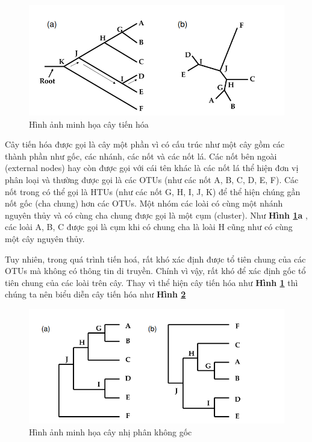 \documentclass[12pt]{report}
\begin{document}
\begin{figure}[h]
	\centering
	\includegraphics[scale=1]{Image/1.1.png}
	\caption{Hình ảnh minh họa cây tiến hóa \cite{cia-2}}
	\label{fig:image1.1}
\end{figure}

Cây tiến hóa \cite{cia-2} được gọi là cây một phần vì có cấu trúc như một cây gồm các thành phần như gốc, các nhánh, các nốt và các nốt lá. Các nốt bên ngoài (external nodes) hay còn được gọi với cái tên khác là các nốt lá thể hiện đơn vị phân loại và thường được gọi là các OTUs (như các nốt A, B, C, D, E, F). Các nốt trong có thể gọi là HTUs (như các nốt G, H, I, J, K) để thể hiện chúng gần nốt gốc (cha chung) hơn các OTUs. Một nhóm các loài có cùng một nhánh nguyên thủy và có cùng cha chung được gọi là một cụm (cluster). Như \textbf{Hình \ref{fig:image1.1}a }, các loài A, B, C được gọi là cụm khi có chung cha là loài H cũng như có cùng một cây nguyên thủy. 

 Tuy nhiên, trong quá trình tiến hoá, rất khó xác định được tổ tiên chung của các OTUs mà không có thông tin di truyền. Chính vì vậy, rất khó để xác định gốc tổ tiên chung của các loài trên cây. Thay vì thể hiện cây tiến hóa như \textbf{Hình \ref{fig:image1.1}} thì chúng ta nên biểu diễn cây tiến hóa như \textbf{Hình \ref{fig:image1.2}}

\begin{figure}[h]
	\centering
	\includegraphics[scale=1]{Image/1.2.png}
	\caption{Hình ảnh minh họa cây nhị phân không gốc \cite{cia-2}}
	\label{fig:image1.2}
\end{figure}
\end{document}
